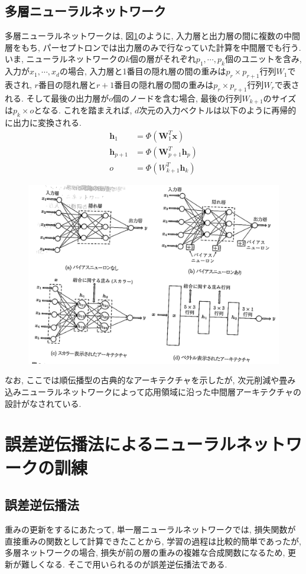 \documentclass[dvipdfmx,report,11pt]{jsbook}
\begin{document}
\subsection{多層ニューラルネットワーク}
多層ニューラルネットワークは, 図\ref{fig11}のように, 入力層と出力層の間に複数の中間層をもち, パーセプトロンでは出力層のみで行なっていた計算を中間層でも行う. いま, ニューラルネットワークの$k$個の層がそれぞれ$p_1, \cdots, p_k$個のユニットを含み, 入力が$x_1, \cdots, x_d$の場合, 入力層と1番目の隠れ層の間の重みは$p_r\times p_{r+1}$行列$W_1$で表され, $r$番目の隠れ層と$r+1$番目の隠れ層の間の重みは$p_r\times p_{r+1}$行列$W_r$で表される. そして最後の出力層が$o$個のノードを含む場合, 最後の行列$W_{k+1}$のサイズは$p_k\times o$となる. これを踏まえれば, $d$次元の入力ベクトルは以下のように再帰的に出力に変換される.
\begin{align*}
  \bm{h}_1&=\Phi(\bm{W}_1^T\bm{x})\\
  \bm{h}_{p+1}&=\Phi(\bm{W}_{p+1}^T\bm{h}_p)\\
  o&=\Phi(W_{k+1}^T\bm{h}_k)
\end{align*}

\begin{figure}[H]
  \centering
    \includegraphics[width=0.6\linewidth]{figure/fig11.png}
    \caption{}
    \label{fig11}
\end{figure}
なお, ここでは順伝播型の古典的なアーキテクチャを示したが, 次元削減や畳み込みニューラルネットワークによって応用領域に沿った中間層アーキテクチャの設計がなされている.

\section{誤差逆伝播法によるニューラルネットワークの訓練}
\subsection{誤差逆伝播法}
重みの更新をするにあたって, 単一層ニューラルネットワークでは, 損失関数が直接重みの関数として計算できたことから, 学習の過程は比較的簡単であったが, 多層ネットワークの場合, 損失が前の層の重みの複雑な合成関数になるため, 更新が難しくなる. そこで用いられるのが誤差逆伝播法である.
\end{document}
